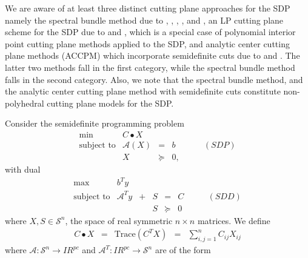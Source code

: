 \documentclass[12pt]{kluwer}
\newcommand{\real}{I\!\! R}
\begin{document}
\begin{article}
We are aware of at least three distinct cutting plane approaches for the SDP namely the spectral bundle method
due to %
,
,
,
, and
,
an LP cutting plane scheme for the SDP due to
 and ,
which is a special
case of polynomial interior point cutting plane methods applied to the SDP, and analytic center cutting plane
methods (ACCPM) which incorporate semidefinite cuts due to
 and .
The latter two methods fall in the first category, while the spectral bundle method falls in the second category.
Also, we note that the spectral bundle method, and the analytic center cutting plane method with semidefinite cuts
constitute non-polyhedral cutting plane models for the SDP.

Consider the semidefinite programming problem
\begin{displaymath}
\begin{array}{lrclr}
\min & C \bullet X \\
\mbox{subject to} & \mathcal{A} (X) & = & b & \qquad (SDP) \\
& X & \succeq  & 0,
\end{array}
\end{displaymath}
with dual
\begin{displaymath}
\begin{array}{lrccclr}
\max & b^Ty \\
\mbox{subject to} & \mathcal{A}^Ty  & + & S & = & C  & \qquad (SDD) \\
&&& S & \succeq & 0
\end{array}
\end{displaymath}
where $ X, S \in \mathcal{S}^{n} $, the space of real symmetric $ n \times n $ matrices. We define
\begin{displaymath}
\begin{array}{ccccc}
C \bullet X & = & \mbox{Trace} (C^TX) & = & \sum_{i,j=1}^n C_{ij}X_{ij}
\end{array}
\end{displaymath}
where $ \mathcal{A} : \mathcal{S}^{n} \to \real^{pc} $ and $ \mathcal{A}^T : \real^{pc} \to \mathcal{S}^n $ are of the form


\end{article}
\end{document}
